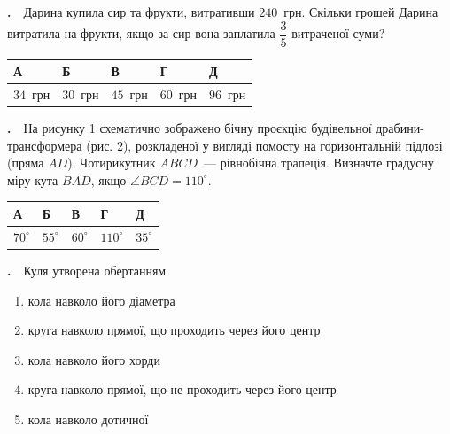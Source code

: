\documentclass[12pt]{article}
\newcommand{\answerTable}[5]{%
\par\vspace{0.15cm}
\noindent
\begin{tabular}{|*{5}{>{\centering\arraybackslash}m{3cm}|}}
\hline
\rule[-0.15cm]{0pt}{0.6cm}\textbf{А} & \rule[-0.15cm]{0pt}{0.6cm}\textbf{Б} & \rule[-0.15cm]{0pt}{0.6cm}\textbf{В} & \rule[-0.15cm]{0pt}{0.6cm}\textbf{Г} & \rule[-0.15cm]{0pt}{0.6cm}\textbf{Д} \\
\hline
\rule[-0.2cm]{0pt}{0.75cm}#1 & \rule[-0.2cm]{0pt}{0.75cm}#2 & \rule[-0.2cm]{0pt}{0.75cm}#3 & \rule[-0.2cm]{0pt}{0.75cm}#4 & \rule[-0.2cm]{0pt}{0.75cm}#5 \\
\hline
\end{tabular}
\par\vspace{0.25cm}
}
\newcounter{zad}
\newcommand{\zadtask}[1]{\stepcounter{zad}\par\vspace{0.3cm}\noindent\textbf{\thezad.}\ \ #1\par\vspace{0.2cm}}
\newcommand{\zadnum}{\stepcounter{zad}\noindent\textbf{\thezad.}\ \ }
\begin{document}
\zadtask{Дарина купила сир та фрукти, витративши $240$~грн. Скільки грошей Дарина витратила на фрукти, якщо за сир вона заплатила $\dfrac{3}{5}$ витраченої суми?}
\answerTable{$34$~грн}{$30$~грн}{$45$~грн}{$60$~грн}{$96$~грн}

\noindent
\begin{minipage}[c]{0.56\textwidth}
\zadnum На рисунку 1 схематично зображено бічну проєкцію будівельної драбини-трансформера (рис. 2), розкладеної у вигляді помосту на горизонтальній підлозі (пряма $AD$). Чотирикутник $ABCD$~--- рівнобічна трапеція. Визначте градусну міру кута $BAD$, якщо $\angle BCD = 110^\circ$.
\end{minipage}%
\hfill
\begin{minipage}[c]{0.42\textwidth}
\centering
{}
\end{minipage}
\par\vspace{0.2cm}
\answerTable{$70^\circ$}{$55^\circ$}{$60^\circ$}{$110^\circ$}{$35^\circ$}

\zadtask{Куля утворена обертанням
\vspace{0.1cm}
\begin{enumerate}[label=\textbf{\Alph*}, leftmargin=2.8em, itemsep=0.1cm]
    \item кола навколо його діаметра
    \item круга навколо прямої, що проходить через його центр
    \item кола навколо його хорди
    \item круга навколо прямої, що не проходить через його центр
    \item кола навколо дотичної
\end{enumerate}
\vspace{0.1cm}}
\end{document}

